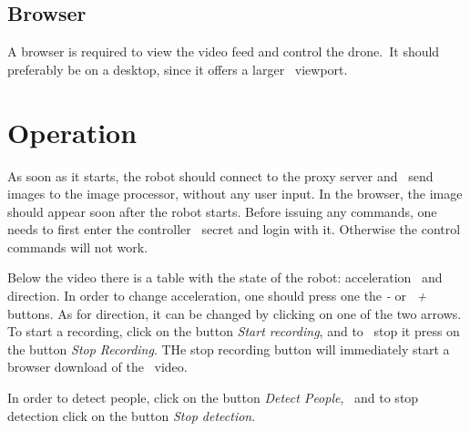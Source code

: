 \subsection{Browser}
\label{subsec:user-manual-browser}
A browser is required to view the video feed and control the drone.\
It should preferably be on a desktop, since it offers a larger \
viewport.

\section{Operation}
\label{sec:user-manual-operation}
As soon as it starts, the robot should connect to the proxy server and \
send images to the image processor, without any user input.
In the browser, the image should appear soon after the robot starts.
Before issuing any commands, one needs to first enter the controller \
secret and login with it.
Otherwise the control commands will not work.

Below the video there is a table with the state of the robot: acceleration \
and direction.
In order to change acceleration, one should press one the \textit{-} or \
\textit{+} buttons.
As for direction, it can be changed by clicking on one of the two arrows.
To start a recording, click on the button \textit{Start recording}, and to \
stop it press on the button \textit{Stop Recording}.
THe stop recording button will immediately start a browser download of the \
video.

In order to detect people, click on the button \textit{Detect People}, \
and to stop detection click on the button \textit{Stop detection}.
